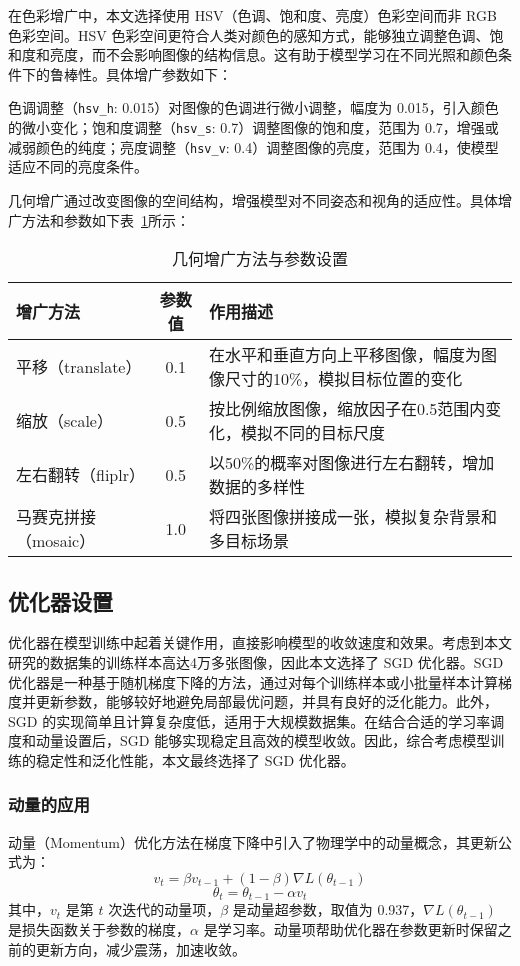 在色彩增广中，本文选择使用 HSV（色调、饱和度、亮度）色彩空间而非 RGB 色彩空间。HSV 色彩空间更符合人类对颜色的感知方式，能够独立调整色调、饱和度和亮度，而不会影响图像的结构信息。这有助于模型学习在不同光照和颜色条件下的鲁棒性。具体增广参数如下：

色调调整（\texttt{hsv\_h}: 0.015）对图像的色调进行微小调整，幅度为 0.015，引入颜色的微小变化；饱和度调整（\texttt{hsv\_s}: 0.7）调整图像的饱和度，范围为 0.7，增强或减弱颜色的纯度；亮度调整（\texttt{hsv\_v}: 0.4）调整图像的亮度，范围为 0.4，使模型适应不同的亮度条件。

几何增广通过改变图像的空间结构，增强模型对不同姿态和视角的适应性。具体增广方法和参数如下表~\ref{tab:geometric_augmentation}所示：

\begin{table}[htbp]
	\centering
	\caption{几何增广方法与参数设置}
	\label{tab:geometric_augmentation}
	\begin{tabular}{lcp{8cm}}
		\toprule
		增广方法 & 参数值 & 作用描述 \\
		\midrule
		平移（translate） & 0.1 & 在水平和垂直方向上平移图像，幅度为图像尺寸的10\%，模拟目标位置的变化 \\
		缩放（scale） & 0.5 & 按比例缩放图像，缩放因子在0.5范围内变化，模拟不同的目标尺度 \\
		左右翻转（fliplr） & 0.5 & 以50\%的概率对图像进行左右翻转，增加数据的多样性 \\
		马赛克拼接（mosaic） & 1.0 & 将四张图像拼接成一张，模拟复杂背景和多目标场景 \\
		\bottomrule
	\end{tabular}
\end{table}
\subsection{优化器设置}
优化器在模型训练中起着关键作用，直接影响模型的收敛速度和效果。考虑到本文研究的数据集的训练样本高达4万多张图像，因此本文选择了 SGD 优化器。SGD 优化器是一种基于随机梯度下降的方法，通过对每个训练样本或小批量样本计算梯度并更新参数，能够较好地避免局部最优问题，并具有良好的泛化能力。此外，SGD 的实现简单且计算复杂度低，适用于大规模数据集。在结合合适的学习率调度和动量设置后，SGD 能够实现稳定且高效的模型收敛。因此，综合考虑模型训练的稳定性和泛化性能，本文最终选择了 SGD 优化器。 

\subsubsection{动量的应用}
动量（Momentum）优化方法在梯度下降中引入了物理学中的动量概念，其更新公式为：
\begin{equation}
	v_t = \beta v_{t-1} + (1 - \beta) \nabla L(\theta_{t-1})
\end{equation}
\begin{equation}
	\theta_t = \theta_{t-1} - \alpha v_t
\end{equation}
其中，$v_t$ 是第 $t$ 次迭代的动量项，$\beta$ 是动量超参数，取值为 0.937，$\nabla L(\theta_{t-1})$ 是损失函数关于参数的梯度，$\alpha$ 是学习率。动量项帮助优化器在参数更新时保留之前的更新方向，减少震荡，加速收敛。

